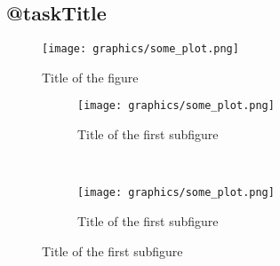 \subsection{@taskTitle}
\label{task:@label}

\begin{figure}[H] %
    \centering
    \caption{Title of the figure}
    \label{fig:label}
    \texttt{[image: graphics/some\_plot.png]}
\end{figure}

\begin{figure}[H] %
    \centering
    \caption{Title of the figure}
    \label{fig:label}
    \begin{subfigure}[b]{0.49\textwidth}
        \texttt{[image: graphics/some\_plot.png]}
        \caption{Title of the first subfigure}
        \label{sfig:slabel1}
    \end{subfigure}
    ~ 
    \begin{subfigure}[b]{0.49\textwidth}
        \texttt{[image: graphics/some\_plot.png]}
        \caption{Title of the first subfigure}
        \label{sfig:slabel2}
    \end{subfigure}
\end{figure}

